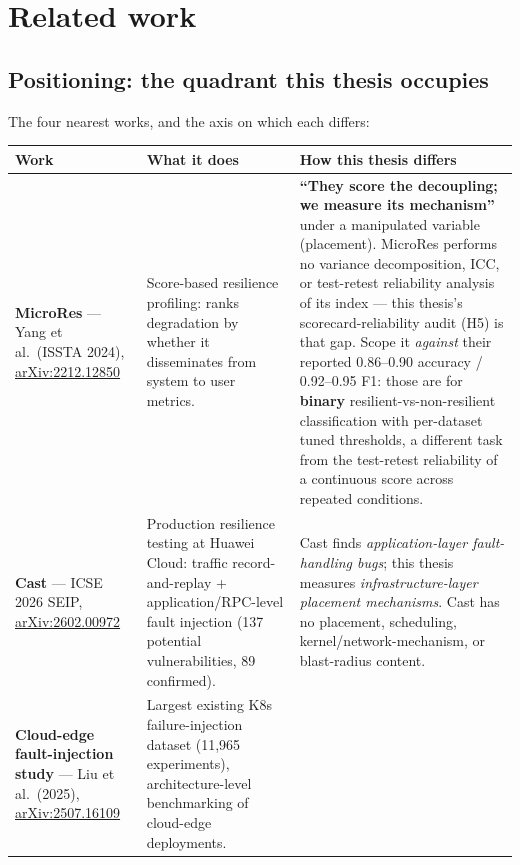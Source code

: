\chapter{Related work}\label{ch:related}

\section{Positioning: the quadrant this thesis occupies}\label{sec:positioning}

The four nearest works, and the axis on which each differs:

\begin{center}
\footnotesize
\begin{tabular}{p{}p{}p{}}
\toprule
\textbf{Work} & \textbf{What it does} & \textbf{How this thesis differs} \\
\midrule
\textbf{MicroRes} --- Yang et al.\ (ISSTA 2024), \href{https://arxiv.org/abs/2212.12850}{arXiv:2212.12850} &
Score-based resilience profiling: ranks degradation by whether it disseminates from system to user metrics. &
\textbf{``They score the decoupling; we measure its mechanism''} under a manipulated variable (placement). MicroRes performs no variance decomposition, ICC, or test-retest reliability analysis of its index --- this thesis's scorecard-reliability audit (H5) is that gap. Scope it \emph{against} their reported 0.86--0.90 accuracy / 0.92--0.95 F1: those are for \textbf{binary} resilient-vs-non-resilient classification with per-dataset tuned thresholds, a different task from the test-retest reliability of a continuous score across repeated conditions. \\
\addlinespace
\textbf{Cast} --- ICSE 2026 SEIP, \href{https://arxiv.org/html/2602.00972v1}{arXiv:2602.00972} &
Production resilience testing at Huawei Cloud: traffic record-and-replay + application/RPC-level fault injection (137 potential vulnerabilities, 89 confirmed). &
Cast finds \emph{application-layer fault-handling bugs}; this thesis measures \emph{infrastructure-layer placement mechanisms}. Cast has no placement, scheduling, kernel/network-mechanism, or blast-radius content. \\
\addlinespace
\textbf{Cloud-edge fault-injection study} --- Liu et al.\ (2025), \href{https://arxiv.org/abs/2507.16109}{arXiv:2507.16109} &
Largest existing K8s failure-injection dataset (11,965 experiments), architecture-level benchmarking of cloud-edge deployments. &

\end{tabular}
\end{center}
